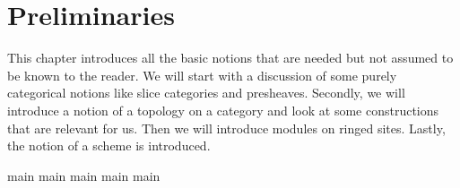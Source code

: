 \chapter{Preliminaries}
This chapter introduces all the basic notions that are needed but not assumed to be known to the reader.
We will start with a discussion of some purely categorical notions like slice categories and presheaves.
Secondly, we will introduce a notion of a topology on a category and look at some constructions that are relevant for us.
Then we will introduce modules on ringed sites.
Lastly, the notion of a scheme is introduced.

{main}
{main}
{main}
{main}
{main}
